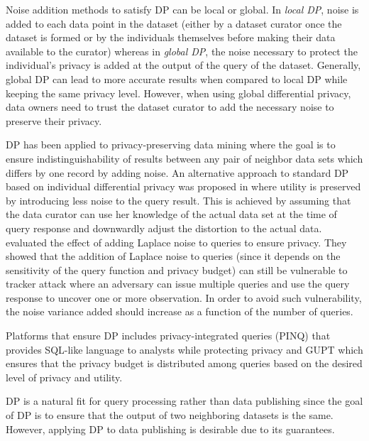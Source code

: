 \documentclass{bioinfo}
\newcommand{\mpara}[1]{\medskip\noindent{\bf #1}}
\begin{document}
Noise addition methods to satisfy DP can be local or global.
In \textit{local DP}, noise is added to each data point in the dataset (either by a dataset curator once the dataset is formed or by the individuals themselves before making their data available to the curator) whereas in \textit{global DP}, the noise necessary to protect the individual's privacy is added at the output of the query of the dataset. Generally, global DP can lead to more accurate results when compared to local DP while keeping the same privacy level. However, when using global differential privacy, data owners need to trust the dataset curator to add the necessary noise to preserve their privacy.

\mpara{DP for answering queries.} DP has been applied to privacy-preserving data mining \cite{cite412friedman2010data, cite413soria2017individual, abadi2016deep, cite414sarathy2011evaluating, cite415mcsherry2009privacy, cite416roy2010airavat, cite417mohan2012gupt} where the goal is to ensure indistinguishability of results between any pair of neighbor data sets which differs by one record by adding noise.  An alternative approach to standard DP based on individual differential privacy was proposed in \cite{cite413soria2017individual} where utility is preserved by introducing less noise to the query result. This is achieved by assuming that the data curator can use her knowledge of the actual data set at the time of query response and downwardly adjust the distortion to the actual data. \citet{cite414sarathy2011evaluating} evaluated the effect of adding Laplace noise to queries to ensure privacy. They showed that the addition of Laplace noise to queries (since it depends on the sensitivity of the query function and privacy budget) can still be vulnerable to tracker attack where an adversary can issue multiple queries and use the query response to uncover one or more observation. In order to avoid such vulnerability, the noise variance added should increase as a function of the number of queries.

Platforms that ensure DP includes privacy-integrated queries (PINQ) \cite{cite415mcsherry2009privacy} that provides SQL-like language to analysts while protecting privacy and GUPT \cite{cite417mohan2012gupt} which ensures that the privacy budget is distributed among queries based on the desired level of privacy and utility.

DP is a natural fit for query processing rather than data publishing since the goal of DP is to ensure that the output of two neighboring datasets is the same. However, applying DP to data publishing is desirable due to its guarantees.
\end{document}
